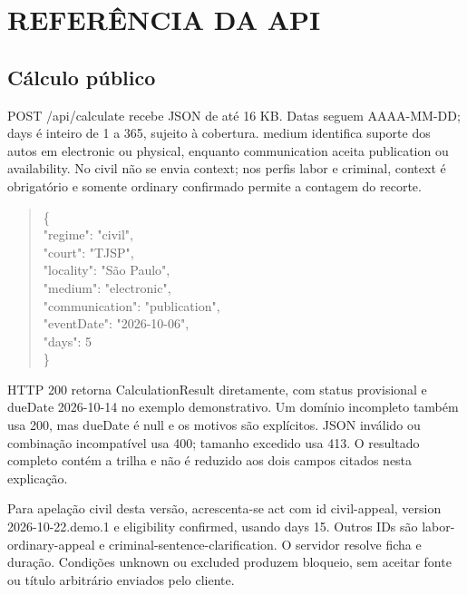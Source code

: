 \chapter{REFERÊNCIA DA API}
\label{chapter-C}
\section{Cálculo público}
\label{section-C-1}
POST /api/calculate recebe JSON de até 16 KB. Datas seguem AAAA-MM-DD; days é inteiro de 1 a 365, sujeito à cobertura. medium identifica suporte dos autos em electronic ou physical, enquanto communication aceita publication ou availability. No civil não se envia context; nos perfis labor e criminal, context é obrigatório e somente ordinary confirmado permite a contagem do recorte.

\begin{quote}\begin{singlespace}\raggedright\ttfamily\footnotesize
\hspace*{0.0em}\{\\
\hspace*{1.0em}"regime": "civil",\\
\hspace*{1.0em}"court": "TJSP",\\
\hspace*{1.0em}"locality": "São Paulo",\\
\hspace*{1.0em}"medium": "electronic",\\
\hspace*{1.0em}"communication": "publication",\\
\hspace*{1.0em}"eventDate": "2026-10-06",\\
\hspace*{1.0em}"days": 5\\
\hspace*{0.0em}\}\\
\end{singlespace}\end{quote}
HTTP 200 retorna CalculationResult diretamente, com status provisional e dueDate 2026-10-14 no exemplo demonstrativo. Um domínio incompleto também usa 200, mas dueDate é null e os motivos são explícitos. JSON inválido ou combinação incompatível usa 400; tamanho excedido usa 413. O resultado completo contém a trilha e não é reduzido aos dois campos citados nesta explicação.

Para apelação civil desta versão, acrescenta-se act com id civil-appeal, version 2026-10-22.demo.1 e eligibility confirmed, usando days 15. Outros IDs são labor-ordinary-appeal e criminal-sentence-clarification. O servidor resolve ficha e duração. Condições unknown ou excluded produzem bloqueio, sem aceitar fonte ou título arbitrário enviados pelo cliente.

